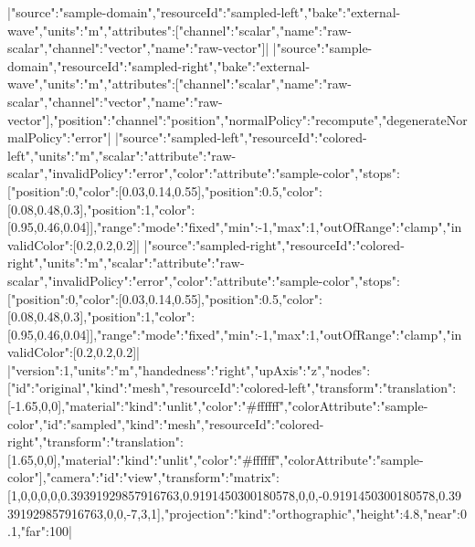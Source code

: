 \documentclass{article}
\begin{document}
\TLSetup{\usepackage{cmbright}}

|{"source":"sample-domain","resourceId":"sampled-left","bake":"external-wave","units":"m","attributes":[{"channel":"scalar","name":"raw-scalar"},{"channel":"vector","name":"raw-vector"}]}|
|{"source":"sample-domain","resourceId":"sampled-right","bake":"external-wave","units":"m","attributes":[{"channel":"scalar","name":"raw-scalar"},{"channel":"vector","name":"raw-vector"}],"position":{"channel":"position","normalPolicy":"recompute","degenerateNormalPolicy":"error"}}|
|{"source":"sampled-left","resourceId":"colored-left","units":"m","scalar":{"attribute":"raw-scalar"},"invalidPolicy":"error","color":{"attribute":"sample-color","stops":[{"position":0,"color":[0.03,0.14,0.55]},{"position":0.5,"color":[0.08,0.48,0.3]},{"position":1,"color":[0.95,0.46,0.04]}],"range":{"mode":"fixed","min":-1,"max":1},"outOfRange":"clamp","invalidColor":[0.2,0.2,0.2]}}|
|{"source":"sampled-right","resourceId":"colored-right","units":"m","scalar":{"attribute":"raw-scalar"},"invalidPolicy":"error","color":{"attribute":"sample-color","stops":[{"position":0,"color":[0.03,0.14,0.55]},{"position":0.5,"color":[0.08,0.48,0.3]},{"position":1,"color":[0.95,0.46,0.04]}],"range":{"mode":"fixed","min":-1,"max":1},"outOfRange":"clamp","invalidColor":[0.2,0.2,0.2]}}|
\loomspace|{"version":1,"units":"m","handedness":"right","upAxis":"z","nodes":[{"id":"original","kind":"mesh","resourceId":"colored-left","transform":{"translation":[-1.65,0,0]},"material":{"kind":"unlit","color":"#ffffff","colorAttribute":"sample-color"}},{"id":"sampled","kind":"mesh","resourceId":"colored-right","transform":{"translation":[1.65,0,0]},"material":{"kind":"unlit","color":"#ffffff","colorAttribute":"sample-color"}}],"camera":{"id":"view","transform":{"matrix":[1,0,0,0,0,0.39391929857916763,0.9191450300180578,0,0,-0.9191450300180578,0.39391929857916763,0,0,-7,3,1]},"projection":{"kind":"orthographic","height":4.8,"near":0.1,"far":100}}}|
\end{document}
